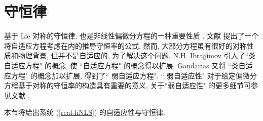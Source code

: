 \section{守恒律}
基于 Lie 对称的守恒律, 也是非线性偏微分方程的一种重要性质 .
文献 \cite{INH07} 提出了一个将自适应方程考虑在内的推导守恒率的公式. 然而, 大部分方程虽有很好的对称性质和物理背景, 但并不是自适应的.
为了解决这个问题, N.H. Ibragimov 引入了``类自适应方程" 的概念, 使 ``自适应方程" 的概念得以扩展. Gandarias 又将 ``类自适应方程" 的概念加以扩展, 得到了`` 弱自适应方程". `` 弱自适应性" 对于给定偏微分方程基于对称的守恒率的构造具有重要的意义, 关于``弱自适应性" 的更多细节可参见文献 \cite{NTT11,BMS09}. 

本节将给出系统 (\ref{real-hNLS}) 的自适应性与守恒律.

